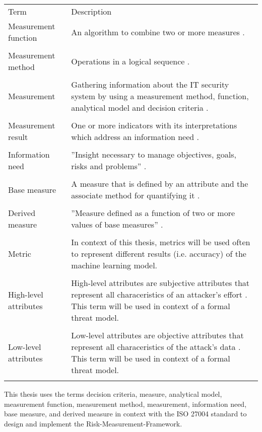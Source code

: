 \begin{center}
  \begin{tabular}{ |L{4cm}|L{10cm}|  }
    \hline
     Term & Description \\ [0.5ex]
    Measurement function & An algorithm to combine two or more measures \cite{ISO_27004_2009}. \\
    & \\
    \hline
    Measurement method & Operations in a logical sequence \cite{ISO_27004_2009}. \\
    & \\
    \hline
    Measurement & Gathering information about the IT security system by using a measurement method, function, analytical model and decision criteria \cite{ISO_27004_2009}. \\
    & \\
    \hline
    Measurement result & One or more indicators with its interpretations which address an information need \cite{ISO_27004_2009}. \\
    & \\
    \hline
    Information need & ''Insight necessary to manage objectives, goals, risks and problems'' \cite{ISO_27004_2009}. \\
    & \\
    \hline
    Base measure & A measure that is defined by an attribute and the associate method for quantifying it \cite{ISO_27004_2009}. \\
    & \\
    \hline
    Derived measure & ''Measure defined as a function of two or more values of base measures'' \cite{ISO_27004_2009}.\\
    & \\
    \hline
    Metric & In context of this thesis, metrics will be used often to represent different results (i.e. accuracy) of the machine learning model. \\
    & \\
    \hline
    High-level attributes & High-level attributes are subjective attributes that represent all characeristics of an attacker's effort \cite{DBLP:conf/crisis/DoynikovaNGK20}. This term will be used in context of a formal threat model. \\
    & \\
    \hline
    Low-level attributes & Low-level attributes are objective attributes that represent all characeristics of the attack's data \cite{DBLP:conf/crisis/DoynikovaNGK20}. This term will be used in context of a formal threat model. \\
    & \\
    \hline
  \end{tabular}
\end{center}

This thesis uses the terms decision criteria, measure, analytical model, measurement function, measurement method, measurement, information need, base measure, and derived measure in context with the ISO 27004 standard to design and implement the Risk-Measurement-Framework.
